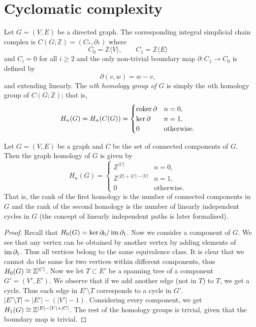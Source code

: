 \section{Cyclomatic complexity}

\begin{definition}
    Let $G = (V,E)$ be a directed graph. The corresponding integral simplicial chain complex is $C(G; \mathbb Z) = (C_*, \partial_*)$ where
    \[ C_0 = \mathbb Z \langle V \rangle, \qquad C_1 = \mathbb Z \langle E \rangle \]
    and $C_i = 0$ for all $i \geq 2$ and the only non-trivial boundary map $\partial: C_1 \to C_0$ is defined by
    \[ \partial(v, w) = w - v, \]
    and extending linearly. The \emph{$n$th homology group of $G$} is simply the $n$th homology group of $C(G; \mathbb Z)$; that is,
    \[
        H_n(G) = H_n(C(G)) =
        \begin{cases}
            \operatorname{coker}\partial & n = 0,            \\
            \ker\partial   & n = 1,            \\
            0              & \text{otherwise}.
        \end{cases}
    \]
\end{definition}

\begin{proposition} \label{prop:graph-homology}
    Let $G = (V,E)$ be a graph and $C$ be the set of connected components of $G$. Then the graph homology of $G$ is given by
    \[
        H_n(G) = \begin{cases}
            \mathbb Z^{\lvert C \rvert}                                     & n  = 0,           \\
            \mathbb Z^{\lvert E \rvert + \lvert C \rvert - \lvert V \rvert} & n = 1,            \\
            0                                                               & \text{otherwise}.
        \end{cases}
    \]
    That is, the rank of the first homology is the number of connected components in $G$ and the rank of the second homology is the number of linearly independent cycles in $G$ (the concept of linearly independent paths is later formalised).
\end{proposition}

\begin{proof}
    Recall that $H_0(G) = \ker \partial_0 / \operatorname{im} \partial_1$. Now we consider a component of $G$. We see that any vertex can be obtained by another vertex by adding elements of $\operatorname{im} \partial_1$. Thus all vertices belong to the same equivalence class. It is clear that we cannot do the same for two vertices within different components, thus $H_0(G) \cong \mathbb Z^{\lvert C \rvert}$. Now we let $T \subset E'$ be a spanning tree of a component $G' = (V', E')$. We observe that if we add another edge (not in $T$) to $T$, we get a cycle. Thus each edge in $E' \setminus T$ corresponds to a cycle in $G'$. $\lvert E' \setminus T \rvert = \lvert E' \rvert - (\lvert V' \rvert - 1)$. Considering every component, we get $H_1(G) \cong \mathbb Z^{\lvert E \rvert - \lvert V \rvert + \lvert C \rvert}$. The rest of the homology groups is trivial, given that the boundary map is trivial.
\end{proof}

